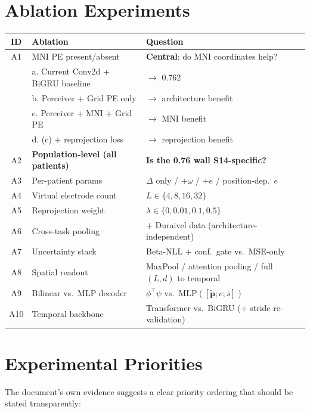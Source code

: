 \documentclass[11pt,letterpaper]{article}
\newcommand{\bfp}{\mathbf{p}}
\begin{document}
\section{Ablation Experiments}

\begin{table}[h]\centering\small
\begin{tabular}{@{}clp{7cm}@{}}
\toprule
\textbf{ID} & \textbf{Ablation} & \textbf{Question} \\
\midrule
A1 & MNI PE present/absent & \textbf{Central}: do MNI coordinates help? \\
 & \quad a. Current Conv2d + BiGRU baseline & $\to$ 0.762 \\
 & \quad b. Perceiver + Grid PE only & $\to$ architecture benefit \\
 & \quad c. Perceiver + MNI + Grid PE & $\to$ MNI benefit \\
 & \quad d. (c) + reprojection loss & $\to$ reprojection benefit \\
\midrule
A2 & \textbf{Population-level (all patients)} & \textbf{Is the 0.76 wall S14-specific?} \\
\midrule
A3 & Per-patient params & $\Delta$ only / $+\omega$ / $+e$ / position-dep.\ $e$ \\
A4 & Virtual electrode count & $L \in \{4, 8, 16, 32\}$ \\
A5 & Reprojection weight & $\lambda \in \{0, 0.01, 0.1, 0.5\}$ \\
A6 & Cross-task pooling & $+$ Duraivel data (architecture-independent) \\
A7 & Uncertainty stack & Beta-NLL + conf.\ gate vs.\ MSE-only \\
A8 & Spatial readout & MaxPool / attention pooling / full $(L,d)$ to temporal \\
A9 & Bilinear vs.\ MLP decoder & $\phi^\top\psi$ vs.\ $\text{MLP}([\tilde{\bfp}; e; \bar{s}])$ \\
A10 & Temporal backbone & Transformer vs.\ BiGRU (+ stride re-validation) \\
\bottomrule
\end{tabular}
\end{table}


\section{Experimental Priorities}\label{sec:priorities}

The document's own evidence suggests a clear priority ordering that should be stated transparently:
\end{document}
